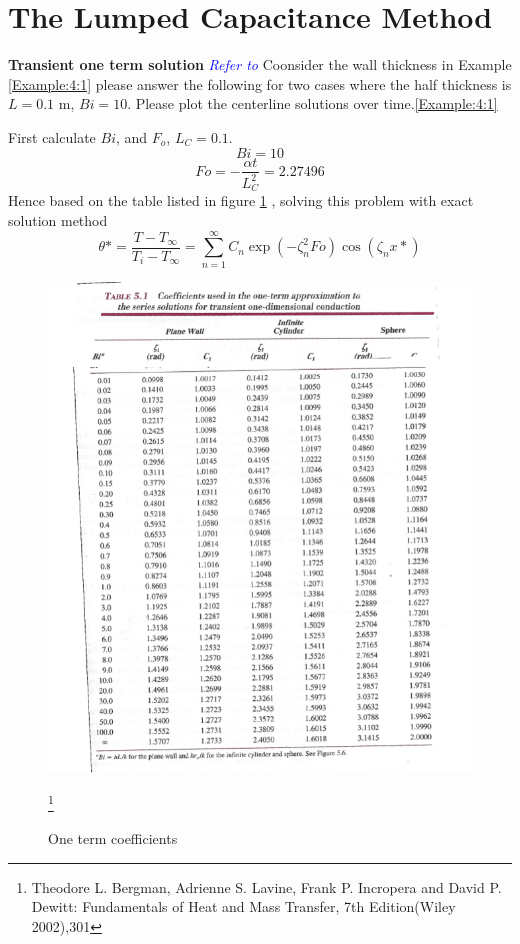 \section{The Lumped Capacitance Method}
\begin{example}
\textbf{Transient one term solution}
\textcolor{blue} {\emph{Refer to  }}
Coonsider the wall thickness in Example \ref{Example:4:1} please answer the following for two cases where the half thickness is $L =0.1$ m, $Bi=10$. Please plot the centerline solutions over time.\ref{Example:4:1}
\end{example}
\begin{solution}
First calculate $Bi$, and $F_o$, $L_C= 0.1$.
$$Bi= 10$$
$$Fo=-\frac{\alpha t}{L_C^2}=2.27496$$
Hence based on the table listed in figure \ref{fig:4:12} , solving this problem with exact solution method
$$\theta*=\frac{T-T_\infty}{T_i-T_\infty}=\sum_{n=1}^{\infty}C_n\exp(-\zeta^2_nFo)\cos(\zeta_nx*)$$ 

\begin{figure}[H]
  \centering
    \includegraphics[scale=1.2]{figures/ch4/12}
    \caption{One term coefficients}\footnote{Theodore L. Bergman,  Adrienne S. Lavine, Frank P. Incropera and David P. Dewitt: Fundamentals of Heat and Mass Transfer, 7th Edition(Wiley 2002),301}
    \label{fig:4:12}
\end{figure}



\end{solution}
